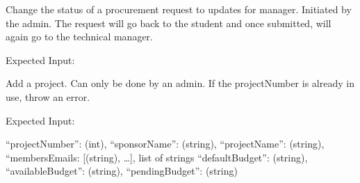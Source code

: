 \documentclass[letterpaper,10pt,english]{sphinxmanual}
\begin{document}
\begin{fulllineitems}
\begin{fulllineitems}
\end{fulllineitems}


\begin{fulllineitems}
\label{\detokenize{apidoc/utdesign_procurement:utdesign_procurement.apigateway.ApiGateway.procurementUpdateManagerAdmin}}
Change the status of a procurement request to updates for manager.
Initiated by the admin. The request will go back to the student
and once submitted, will again go to the technical manager.

Expected Input:

\begin{sphinxVerbatim}[commandchars=\\\{\}]
     
     
\end{sphinxVerbatim}

\end{fulllineitems}


\begin{fulllineitems}
\label{\detokenize{apidoc/utdesign_procurement:utdesign_procurement.apigateway.ApiGateway.projectAdd}}
Add a project. Can only be done by an admin.
If the projectNumber is already in use, throw an error.

Expected Input:

\begin{sphinxVerbatim}[commandchars=\\\{\}]
\PYGZob{}
    “projectNumber”: (int),
    “sponsorName”: (string),
    “projectName”: (string),
    “membersEmails: [(string), …], \PYGZsh{} list of strings
    “defaultBudget”: (string),
    “availableBudget”: (string),
    “pendingBudget”: (string)
\PYGZcb{}
\end{sphinxVerbatim}


\end{fulllineitems}
\end{fulllineitems}
\end{document}
